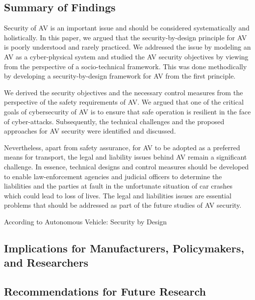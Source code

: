 \subsection{Summary of Findings}\label{subsec:summary-of-findings}
Security of AV is an important issue and should be
considered systematically and holistically. In this paper, we
argued that the security-by-design principle for AV is poorly
understood and rarely practiced. We addressed the issue by
modeling an AV as a cyber-physical system and studied the
AV security objectives by viewing from the perspective of
a socio-technical framework. This was done methodically by
developing a security-by-design framework for AV from the
first principle.

We derived the security objectives and the necessary control
measures from the perspective of the safety requirements of
AV. We argued that one of the critical goals of cybersecurity
of AV is to ensure that safe operation is resilient in the face
of cyber-attacks. Subsequently, the technical challenges and
the proposed approaches for AV security were identified and
discussed.

Nevertheless, apart from safety assurance, for AV to be
adopted as a preferred means for transport, the legal and
liability issues behind AV remain a significant challenge. In
essence, technical designs and control measures should be
developed to enable law-enforcement agencies and judicial
officers to determine the liabilities and the parties at fault in the
unfortunate situation of car crashes which could lead to loss
of lives. The legal and liabilities issues are essential problems
that should be addressed as part of the future studies of AV
security.

According to Autonomous Vehicle: Security by Design


\subsection{Implications for Manufacturers, Policymakers, and Researchers}\label{subsec:implications-for-manufacturers-policymakers-and-researchers}
\subsection{Recommendations for Future Research}\label{subsec:recommendations-for-future-research}
